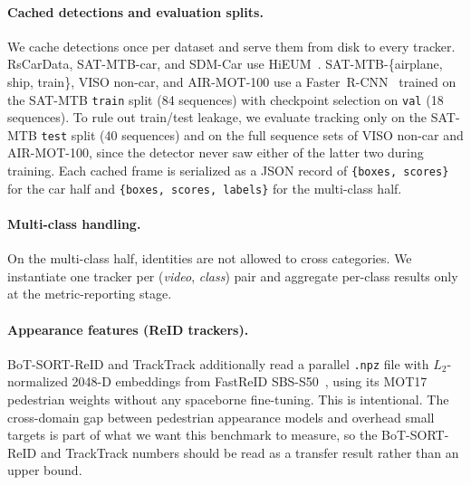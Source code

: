 \documentclass{article}
\begin{document}
\paragraph{Cached detections and evaluation splits.}
We cache detections once per dataset and serve them from disk to
every tracker. RsCarData, SAT-MTB-car, and SDM-Car use
HiEUM~\citep{Xiao2024HiEUM}. SAT-MTB-\{airplane, ship, train\}, VISO
non-car, and AIR-MOT-100 use a Faster~R-CNN~\citep{ren2015fasterrcnn}
trained on the SAT-MTB \texttt{train} split (84 sequences) with
checkpoint selection on \texttt{val} (18 sequences). To rule out
train/test leakage, we evaluate tracking only on the SAT-MTB
\texttt{test} split (40 sequences) and on the full sequence sets
of VISO non-car and AIR-MOT-100, since the detector never saw
either of the latter two during training. Each cached frame is
serialized as a JSON record of \texttt{\{boxes, scores\}} for the
car half and \texttt{\{boxes, scores, labels\}} for the multi-class
half.

\paragraph{Multi-class handling.}
On the multi-class half, identities are not allowed to cross
categories. We instantiate one tracker per
(\emph{video}, \emph{class}) pair and aggregate per-class results
only at the metric-reporting stage.

\paragraph{Appearance features (ReID trackers).}
BoT-SORT-ReID and TrackTrack additionally read a parallel
\texttt{.npz} file with $L_2$-normalized 2048-D embeddings from
FastReID SBS-S50~\citep{he2023fastreid}, using its MOT17 pedestrian
weights without any spaceborne fine-tuning. This is intentional.
The cross-domain gap between pedestrian appearance models and
overhead small targets is part of what we want this benchmark to
measure, so the BoT-SORT-ReID and TrackTrack numbers should be read
as a transfer result rather than an upper bound.
\end{document}
